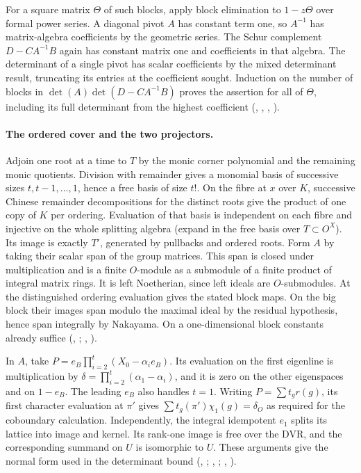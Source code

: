 For a square matrix $\Theta$ of such blocks, apply block elimination to
$1-z\Theta$ over formal power series. A diagonal pivot $A$ has constant
term one, so $A^{-1}$ has matrix-algebra coefficients by the geometric
series. The Schur complement $D-CA^{-1}B$ again has constant matrix one
and coefficients in that algebra. The determinant of a single pivot
has scalar coefficients by the mixed determinant result, truncating its
entries at the coefficient sought. Induction on the number of blocks
in $\det(A)\det(D-CA^{-1}B)$ proves the assertion for all of $\Theta$,
including its full determinant from the highest coefficient
(, , ,
).

\paragraph{The ordered cover and the two projectors.}
Adjoin one root at a time to $T$ by the monic corner polynomial and
the remaining monic quotients. Division with remainder gives a monomial
basis of successive sizes $t,t-1,\ldots,1$, hence a free basis of size
$t!$. On the fibre at $x$ over $K$, successive Chinese remainder
decompositions for the distinct roots give the product of one copy of
$K$ per ordering. Evaluation of that basis is independent on each fibre
and injective on the whole splitting algebra (expand in the free
basis over $T\subset O^X$). Its image is exactly $T'$, generated by
pullbacks and ordered roots. Form $A$ by taking their scalar span of the
group matrices. This span is closed under multiplication and is a finite
$O$-module as a submodule of a finite product of integral matrix rings.
It is left Noetherian, since left ideals are $O$-submodules.
At the distinguished ordering evaluation gives the stated block maps.
On the big block their images span modulo the maximal ideal by the
residual hypothesis, hence span integrally by Nakayama. On a
one-dimensional block constants already suffice
(, ;
,
).

In $A$, take
$P=e_B\prod_{i=2}^t(X_0-\alpha_i e_B)$.
Its evaluation on the first eigenline is multiplication by
$\delta=\prod_{i=2}^t(\alpha_1-\alpha_i)$, and it is zero on the
other eigenspaces and on $1-e_B$. The leading $e_B$ also handles $t=1$.
Writing $P=\sum t_gr(g)$, its first character evaluation at $\pi'$
gives $\sum t_g(\pi')\chi_1(g)=\delta_O$ as required for the
coboundary calculation. Independently, the integral idempotent $e_1$
splits its lattice into image and kernel. Its rank-one image is free
over the DVR, and the corresponding summand on $U$ is isomorphic to
$U$. These arguments give the normal form used in the determinant
bound (, ;
, ;
, ).

